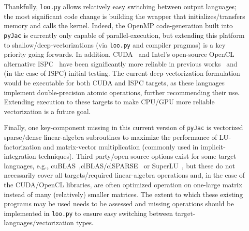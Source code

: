 \documentclass[12pt,number,sort&compress,preprint]{elsarticle}
\begin{document}
Thankfully, \texttt{loo.py} allows relatively easy switching between output languages; the most significant code change is building the wrapper that initializes\slash transfers memory and calls the kernel.
Indeed, the OpenMP code-generation built into \texttt{pyJac} is currently only capable of parallel-execution, but extending this platform to shallow\slash deep-vectorizations (via \texttt{loo.py} and compiler pragmas) is a key priority going forwards.
In addition, CUDA~\cite{NVIDIA:2018} and Intel's open-source OpenCL alternative ISPC~\cite{pharr2012ispc} have been significantly more reliable in previous works~\cite{Niemeyer:2016aa,CurtisGPU:2017} and (in the case of ISPC) initial testing.
The current deep-vectorization formulation would be executable for both CUDA and ISPC targets, as these languages implement double-precision atomic operations, further recommending their use.
Extending execution to these targets to make CPU\slash GPU more reliable vectorization is a future goal.

Finally, one key-component missing in this current version of \texttt{pyJac} is vectorized sparse\slash dense linear-algebra subroutines to maximize the performance of LU-factorization and matrix-vector multiplication (commonly used in implicit-integration techniques).
Third-party\slash open-source options exist for some target-languages, e.g., cuBLAS~\cite{cublas},clBLAS\slash clSPARSE~\cite{clmath} or SuperLU~\cite{superlu99}, but these do not necessarily cover all targets\slash required linear-algebra operations and, in the case of the CUDA\slash OpenCL libraries, are often optimized operation on one-large matrix instead of many (relatively) smaller matrices.
The extent to which these existing programs may be used needs to be assessed and missing operations should be implemented in \texttt{loo.py} to ensure easy switching between target-languages\slash vectorization types.
\end{document}
